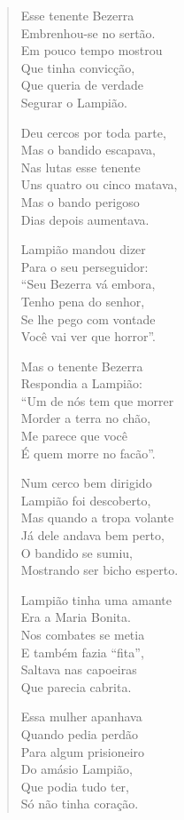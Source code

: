 \begin{verse}
Esse tenente Bezerra\\
Embrenhou-se no sertão.\\
Em pouco tempo mostrou\\
Que tinha convicção,\\
Que queria de verdade\\
Segurar o Lampião.

Deu cercos por toda parte,\\
Mas o bandido escapava,\\
Nas lutas esse tenente\\
Uns quatro ou cinco matava,\\
Mas o bando perigoso\\
Dias depois aumentava.

Lampião mandou dizer\\
Para o seu perseguidor:\\
“Seu Bezerra vá embora,\\
Tenho pena do senhor,\\
Se lhe pego com vontade\\
Você vai ver que horror”.

Mas o tenente Bezerra\\
Respondia a Lampião:\\
“Um de nós tem que morrer\\
Morder a terra no chão,\\
Me parece que você\\
É quem morre no facão”.


Num cerco bem dirigido\\
Lampião foi descoberto,\\
Mas quando a tropa volante\\
Já dele andava bem perto,\\
O bandido se sumiu,\\
Mostrando ser bicho esperto.

Lampião tinha uma amante\\
Era a Maria Bonita.\\
Nos combates se metia\\
E também fazia “fita”,\\
Saltava nas capoeiras\\
Que parecia cabrita.

Essa mulher apanhava\\
Quando pedia perdão\\
Para algum prisioneiro\\
Do amásio Lampião,\\
Que podia tudo ter,\\
Só não tinha coração.


\end{verse}
